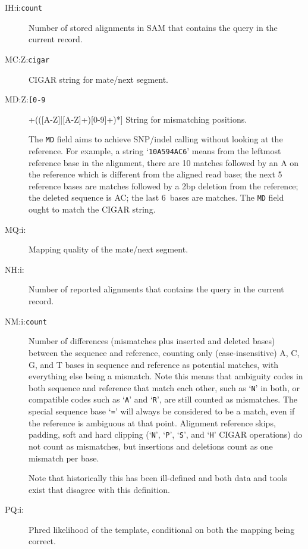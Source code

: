 \documentclass[10pt]{article}
\newcommand{\tagvalue}[1]{\tt #1}
\newcommand{\tagregex}[1]{\tt #1}
\begin{document}
\begin{description}
\item[IH:i:\tagvalue{count}]
Number of stored alignments in SAM that contains the query in the current
record.

\item[MC:Z:\tagvalue{cigar}]
CIGAR string for mate/next segment.

\item[MD:Z:\tagregex{[0-9]+(([A-Z]|[A-Z]+)[0-9]+)*}]
String for mismatching positions.

The {\tt MD} field aims to achieve SNP/indel calling without
looking at the reference. For example, a string `{\tt 10A5\char94AC6}' means
from the leftmost reference base in the alignment, there are 10 matches
followed by an A on the reference which is different from the aligned read
base; the next 5 reference bases are matches followed by a 2bp deletion from
the reference; the deleted sequence is AC; the last 6~bases are matches.
The {\tt MD} field ought to match the {\sf CIGAR} string.

\item[MQ:i:\tagvalue{}]
Mapping quality of the mate/next segment.

\item[NH:i:\tagvalue{}]
Number of reported alignments that contains the query in the current record.

\item[NM:i:\tagvalue{count}]
Number of differences (mismatches plus inserted and deleted bases) between the sequence and reference, counting only (case-insensitive) A, C, G, and T bases in sequence and reference as potential matches, with everything else being a mismatch.
Note this means that ambiguity codes in both sequence and reference that match each other, such as `{\tt N}' in both, or compatible codes such as `{\tt A}' and `{\tt R}', are still counted as mismatches.
The special sequence base `{\tt =}' will always be considered to be a match, even if the reference is ambiguous at that point.
Alignment reference skips, padding, soft and hard clipping (`{\tt N}', `{\tt P}', `{\tt S}', and `{\tt H}' {\sf CIGAR} operations) do not count as mismatches, but insertions and deletions count as one mismatch per base.

Note that historically this has been ill-defined and both data and tools exist that disagree with this definition.

\item[PQ:i:\tagvalue{}]
Phred likelihood of the template, conditional on both the mapping being correct.


\end{description}
\end{document}
